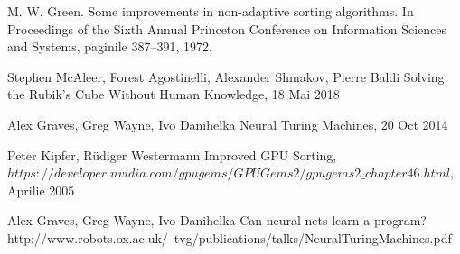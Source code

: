 \documentclass[12pt]{article}
\begin{document}
\begin{thebibliography}{12}
 M. W. Green. Some improvements in non-adaptive sorting algorithms. In Proceedings of the Sixth
 Annual Princeton Conference on Information Sciences and Systems, paginile 387–391, 1972.

 Stephen McAleer, Forest Agostinelli, Alexander Shmakov, Pierre Baldi
 Solving the Rubik's Cube Without Human Knowledge, 18 Mai 2018

 Alex Graves, Greg Wayne, Ivo Danihelka
 Neural Turing Machines, 20 Oct 2014
 
 \newblock Peter Kipfer, Rüdiger Westermann
 \newblock Improved GPU Sorting,
 \newblock $https://developer.nvidia.com/gpugems/GPUGems2/gpugems2\_chapter46.html$, Aprilie 2005
 
 \newblock Alex Graves, Greg Wayne, Ivo Danihelka
 \newblock Can neural nets learn a program?
 \newblock http://www.robots.ox.ac.uk/~tvg/publications/talks/NeuralTuringMachines.pdf

\end{thebibliography}
\end{document}
